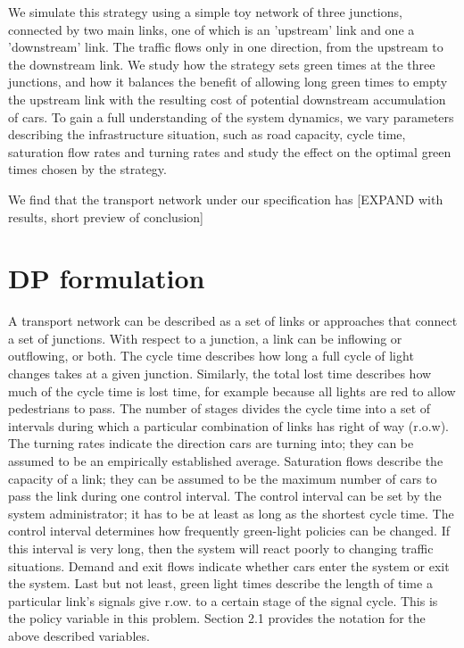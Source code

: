 \documentclass[11pt]{article}
\begin{document}
We simulate this strategy using a simple toy network of three junctions, connected by two main links, one of which is an 'upstream' link and one a 'downstream' link. The traffic flows only in one direction, from the upstream to the downstream link. We study how the strategy sets green times at the three junctions, and how it balances the benefit of allowing long green times to empty the upstream link with the resulting cost of potential downstream accumulation of cars. To gain a full understanding of the system dynamics, we vary parameters describing the infrastructure situation, such as road capacity, cycle time, saturation flow rates and turning rates and study the effect on the optimal green times chosen by the strategy.


We find that the transport network under our specification has [EXPAND with results, short preview of conclusion]

\section{DP formulation}
A transport network can be described as a set of links or approaches that connect a set of junctions. With respect to a junction, a link can be inflowing or outflowing, or both. The cycle time describes how long a full cycle of light changes takes at a given junction. Similarly, the total lost time describes how much of the cycle time is lost time, for example because all lights are red to allow pedestrians to pass. The number of stages divides the cycle time into a set of intervals during which a particular combination of links has right of way (r.o.w). The turning rates indicate the direction cars are turning into; they can be assumed to be an empirically established average. Saturation flows describe the capacity of a link; they can be assumed to be the maximum number of cars to pass the link during one control interval. The control interval can be set by the system administrator; it has to be at least as long as the shortest cycle time. The control interval determines how frequently green-light policies can be changed. If this interval is very long, then the system will react poorly to changing traffic situations. Demand and exit flows indicate whether cars enter the system or exit the system. Last but not least, green light times describe the length of time a particular link's signals give r.ow. to a certain stage of the signal cycle. This is the policy variable in this problem. Section 2.1 provides the notation for the above described variables.
\end{document}
